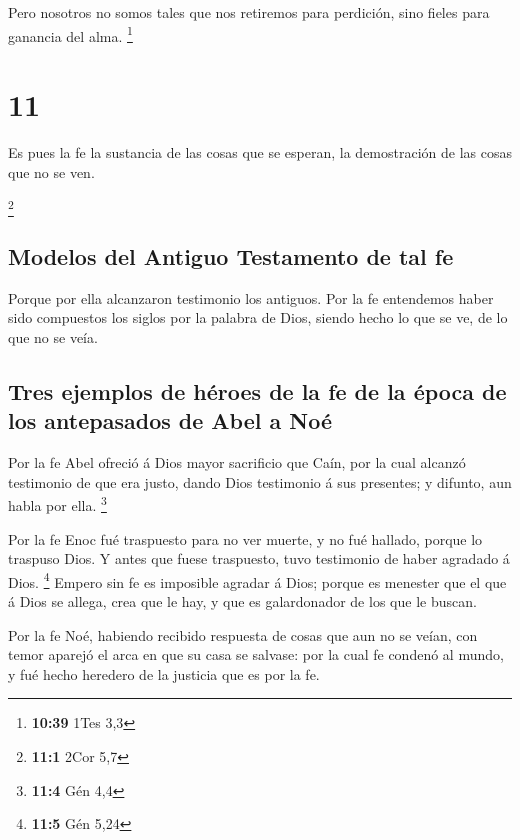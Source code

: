  Pero nosotros no somos tales que nos retiremos para
perdición, sino fieles para ganancia del alma. \footnote{\textbf{10:39}
  1Tes 3,3}

\hypertarget{section-10}{%
\section{11}\label{section-10}}

 Es pues la fe la sustancia de las cosas que se esperan,
la demostración de las cosas que no se ven.

\footnote{\textbf{11:1} 2Cor 5,7}

\hypertarget{modelos-del-antiguo-testamento-de-tal-fe}{%
\subsection{Modelos del Antiguo Testamento de tal
fe}\label{modelos-del-antiguo-testamento-de-tal-fe}}

 Porque por ella alcanzaron testimonio los antiguos.
 Por la fe entendemos haber sido compuestos los siglos por
la palabra de Dios, siendo hecho lo que se ve, de lo que no se veía.

\hypertarget{tres-ejemplos-de-huxe9roes-de-la-fe-de-la-uxe9poca-de-los-antepasados-de-abel-a-nouxe9}{%
\subsection{Tres ejemplos de héroes de la fe de la época de los
antepasados \hspace{0pt}\hspace{0pt}de Abel a
Noé}\label{tres-ejemplos-de-huxe9roes-de-la-fe-de-la-uxe9poca-de-los-antepasados-de-abel-a-nouxe9}}

 Por la fe Abel ofreció á Dios mayor sacrificio que Caín,
por la cual alcanzó testimonio de que era justo, dando Dios testimonio á
sus presentes; y difunto, aun habla por ella. \footnote{\textbf{11:4}
  Gén 4,4}

 Por la fe Enoc fué traspuesto para no ver muerte, y no
fué hallado, porque lo traspuso Dios. Y antes que fuese traspuesto, tuvo
testimonio de haber agradado á Dios. \footnote{\textbf{11:5} Gén 5,24}
 Empero sin fe es imposible agradar á Dios; porque es
menester que el que á Dios se allega, crea que le hay, y que es
galardonador de los que le buscan.

 Por la fe Noé, habiendo recibido respuesta de cosas que
aun no se veían, con temor aparejó el arca en que su casa se salvase:
por la cual fe condenó al mundo, y fué hecho heredero de la justicia que
es por la fe.

